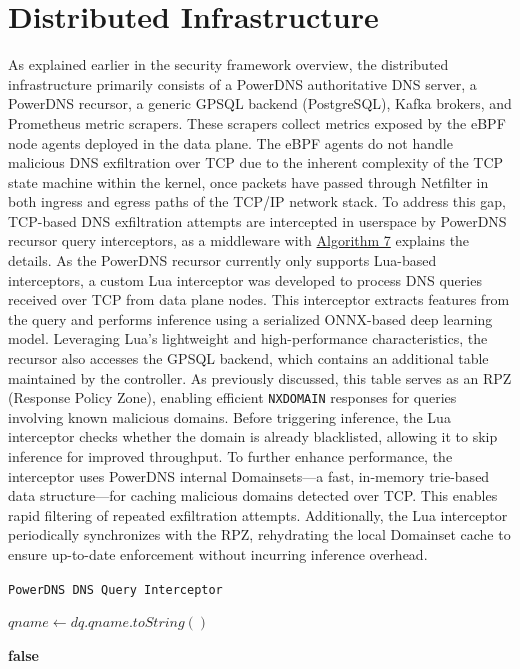 \documentclass [11pt, proquest] {uwthesis}[2020/02/24]
\begin{document}
\section{Distributed Infrastructure }
As explained earlier in the security framework overview, the distributed infrastructure primarily consists of a PowerDNS authoritative DNS server, a PowerDNS recursor, a generic GPSQL backend (PostgreSQL), Kafka brokers, and Prometheus metric scrapers. These scrapers collect metrics exposed by the eBPF node agents deployed in the data plane. The eBPF agents do not handle malicious DNS exfiltration over TCP due to the inherent complexity of the TCP state machine within the kernel, once packets have passed through Netfilter in both ingress and egress paths of the TCP/IP network stack. To address this gap, TCP-based DNS exfiltration attempts are intercepted in userspace by PowerDNS recursor query interceptors, as a middleware with \hyperref[sec:alg7]{Algorithm 7} explains the details. As the PowerDNS recursor currently only supports Lua-based interceptors, a custom Lua interceptor was developed to process DNS queries received over TCP from data plane nodes. This interceptor extracts features from the query and performs inference using a serialized ONNX-based deep learning model. Leveraging Lua’s lightweight and high-performance characteristics, the recursor also accesses the GPSQL backend, which contains an additional table maintained by the controller. As previously discussed, this table serves as an RPZ (Response Policy Zone), enabling efficient \texttt{NXDOMAIN} responses for queries involving known malicious domains. Before triggering inference, the Lua interceptor checks whether the domain is already blacklisted, allowing it to skip inference for improved throughput. To further enhance performance, the interceptor uses PowerDNS internal Domainsets—a fast, in-memory trie-based data structure—for caching malicious domains detected over TCP. This enables rapid filtering of repeated exfiltration attempts. Additionally, the Lua interceptor periodically synchronizes with the RPZ, rehydrating the local Domainset cache to ensure up-to-date enforcement without incurring inference overhead.

\begin{algorithm}[H]
\caption{\texttt{PowerDNS DNS Query Interceptor}}
\label{sec:alg7}
$qname \gets dq.qname.toString()$\;

\small %

\Return \textbf{false}\;
\end{algorithm}
\end{document}

